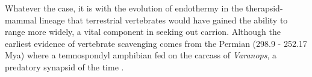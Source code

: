 \documentclass[a4paper,12pt]{article}
\begin{document}


Whatever the case, it is with the evolution of endothermy in the therapsid-mammal lineage \citep{clarke2010temperature} that terrestrial vertebrates would have gained the ability to range more widely, a vital component in seeking out carrion. 
Although the earliest evidence of vertebrate scavenging comes from the Permian (298.9 - 252.17 Mya) where a temnospondyl amphibian fed on the carcass of \textit{Varanops}, a predatory synapsid of the time \citep{reisz2006articulated}. 
\end{document}
